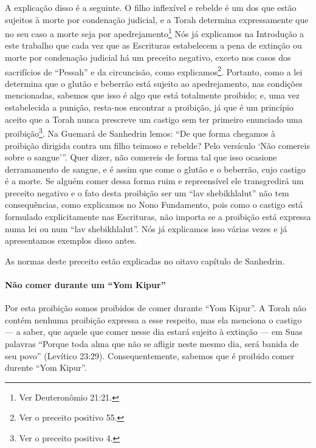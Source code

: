 A explicação disso é a seguinte. O filho inflexível e rebelde é um dos
que estão sujeitos à morte por condenação judicial, e a Torah determina
expressamente que no seu caso a morte seja por
apedrejamento\footnote{Ver Deuteronômio 21:21.} Nós já explicamos na Introdução a
este trabalho que cada vez que as Escrituras estabelecem a pena de
extinção ou morte por condenação judicial há um preceito negativo,
exceto nos casos dos sacrifícios de ``Pessah'' e da circuncisão, como
explicamos\footnote{Ver o preceito positivo 55.}. Portanto, como a lei determina que o
glutão e beberrão está sujeito ao apedrejamento, nas condições
mencionadas, sabemos que isso é algo que está totalmente proibido; e,
uma vez estabelecida a punição, resta-nos encontrar a proibição, já que
é um princípio aceito que a Torah nunca prescreve um castigo sem ter
primeiro enunciado uma proibição\footnote{Ver o preceito positivo 4.}. Na Guemará de
Sanhedrin lemos: ``De que forma chegamos à proibição dirigida contra um
filho teimoso e rebelde? Pelo versículo `Não comereis sobre o sangue'''.
Quer dizer, não comereis de forma tal que isso ocasione derramamento de
sangue, e é assim que come o glutão e o beberrão, cujo castigo é a
morte. Se alguém comer dessa forma ruim e repreensível ele transgredirá
um preceito negativo e o fato desta proibição ser um ``lav
shebikhlalut'' não tem consequências, como explicamos no Nono
Fundamento, pois como o castigo está formulado explicitamente nas
Escrituras, não importa se a proibição está expressa numa lei ou num
``lav shebikhlalut''. Nós já explicamos isso várias vezes e já
apresentamos exemplos disso antes.

As normas deste preceito estão explicadas no oitavo capítulo de Sanhedrin.

\paragraph{Não comer durante um ``Yom Kipur''}

Por esta proibição somos proibidos de comer durante ``Yom Kipur''. A
Torah não contém nenhuma proibição expressa a esse respeito, mas ela
menciona o castigo --- a saber, que aquele que comer nesse dia estará
sujeito à extinção --- em Suas palavras ``Porque toda alma que não se
afligir neste mesmo dia, será banida de seu povo'' (Levítico 23:29).
Consequentemente, sabemos que é proibido comer durente ``Yom Kipur''.

